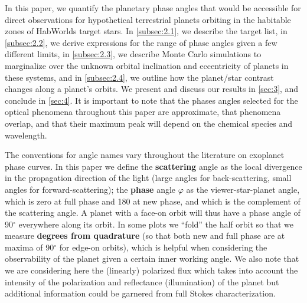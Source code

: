 \documentclass[
    usenatbib,
]{mnras}
\newcommand{\hwo}{HabWorlds}
\begin{document}
In this paper, we quantify the planetary phase angles that would be accessible for direct observations for hypothetical terrestrial planets orbiting in the habitable zones of \hwo{} target stars.
%
In \cref{subsec:2.1}, we describe the target list, in \cref{subsec:2.2}, we derive expressions for the range of phase angles given a few different limits, in \cref{subsec:2.3}, we describe Monte Carlo simulations to marginalize over the unknown orbital inclination and eccentricity of planets in these systems, and in \cref{subsec:2.4}, we outline how the planet/star contrast changes along a planet's orbits.  
%
We present and discuss our results in \cref{sec:3}, and conclude in \cref{sec:4}. 
It is important to note that the phases angles selected for the optical phenomena throughout this paper are approximate, that phenomena overlap, and that their maximum peak will depend on the chemical species and wavelength.

The conventions for angle names vary throughout the literature on exoplanet phase curves. In this paper we define the \textbf{scattering} angle as the local divergence in the propagation direction of the light (large angles for back-scattering, small angles for forward-scattering); the \textbf{phase} angle $\varphi$ as the viewer-star-planet angle, which is zero at full phase and 180 at new phase, and which is the complement of the scattering angle. A planet with a face-on orbit will thus have a phase angle of 90$^\circ$ everywhere along its orbit. In some plots we ``fold'' the half orbit so that we measure \textbf{degrees from quadrature} (so that both new and full phase are at maxima of 90$^\circ$ for edge-on orbits), which is helpful when considering the observability of the planet given a certain inner working angle. We also note that we are considering here the (linearly) polarized flux 
which takes into account the intensity of the polarization and reflectance (illumination) of the planet but additional information could be garnered from full Stokes characterization.



\end{document}
